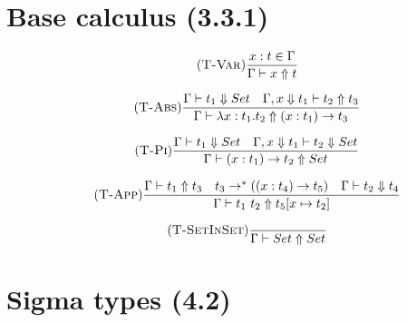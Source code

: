 \documentclass[a4paper, 11pt]{article}
\begin{document}
\section{Base calculus (3.3.1)}

\begin{equation}
    \tag{\textsc{T-Var}}
    \frac{x : t \in \Gamma}
         {\Gamma \vdash x \Uparrow t}
\end{equation}

\begin{equation}
    \tag{\textsc{T-Abs}}
    \frac{\Gamma \vdash t_1 \Downarrow Set \quad
            \Gamma,x \Downarrow t_1 \vdash t_2 \Uparrow t_3}
            {\Gamma \vdash \lambda x : t_1 . t_2
                \Uparrow (x : t_1) \to t_3 }
\end{equation}

\begin{equation}
    \tag{\textsc{T-Pi}}
    \frac{\Gamma \vdash t_1 \Downarrow Set \quad
          \Gamma,x \Downarrow t_1 \vdash t_2 \Downarrow Set}
    {\Gamma \vdash (x : t_1) \to t_2 \Uparrow Set}
\end{equation}

\begin{equation}
    \tag{\textsc{T-App}}
    \frac{\Gamma \vdash t_1 \Uparrow t_3 \quad
          t_3 \to^* ((x : t_4) \to t_5) \quad
          \Gamma \vdash t_2 \Downarrow t_4}
         {\Gamma \vdash t_1 \ t_2 \Uparrow t_5[x \mapsto t_2]}
\end{equation}

\begin{equation}
    \tag{\textsc{T-SetInSet}}
    \frac{}{\Gamma \vdash Set \Uparrow Set}
\end{equation}

\section{Sigma types (4.2)}
\end{document}
